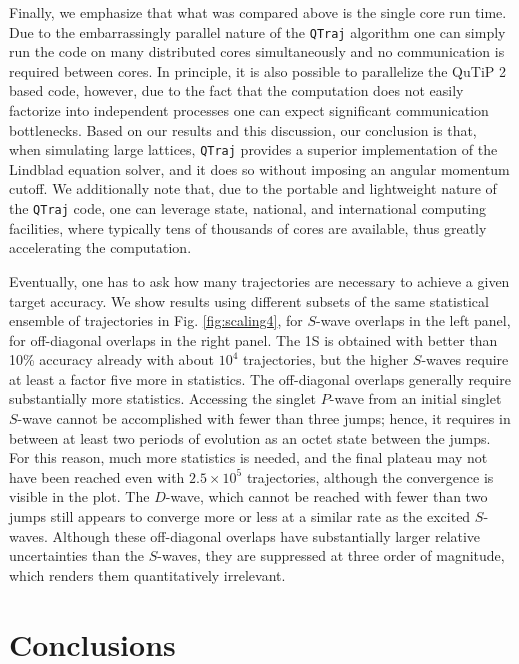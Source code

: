 \documentclass[times,sort&compress,final]{elsarticle}
\def\qtraj{{\tt QTraj} }
\begin{document}
Finally, we emphasize that what was compared above is the single core run time.  Due to the embarrassingly parallel nature of the \qtraj algorithm one can simply run the code on many distributed cores simultaneously and no communication is required between cores.  In principle, it is also possible to parallelize the QuTiP 2 based code, however, due to the fact that the computation does not easily factorize into independent processes one can expect significant communication bottlenecks. Based on our results and this discussion, our conclusion is that, when simulating large lattices, \qtraj provides a superior implementation of the Lindblad equation solver, and it does so without imposing an angular momentum cutoff.  We additionally note that, due to the portable and lightweight nature of the \qtraj code, one can leverage state, national, and international computing facilities, where typically tens of thousands of cores are available, thus greatly accelerating the computation.

Eventually, one has to ask how many trajectories are necessary to achieve a given target accuracy. 
We show results using different subsets of the same statistical ensemble of trajectories in Fig. \ref{fig:scaling4}, 
for $S$-wave overlaps in the left panel, for off-diagonal overlaps in the right panel.
The 1S is obtained with better than 10\% accuracy already with about $10^4$ trajectories, but the higher $S$-waves 
require at least a factor five more in statistics. 
The off-diagonal overlaps generally require substantially more statistics. 
Accessing the singlet $P$-wave from an initial singlet $S$-wave cannot be accomplished with fewer than three 
jumps; hence, it requires in between at least two periods of evolution as an octet state between the jumps.
For this reason, much more statistics is needed, and the final plateau may not have been reached even with 
$2.5\times 10^5$ trajectories, although the convergence is visible in the plot. 
The $D$-wave, which cannot be reached with fewer than two jumps still appears to converge more or less at a similar 
rate as the excited $S$-waves. 
Although these off-diagonal overlaps have substantially larger relative uncertainties than the $S$-waves, they are 
suppressed at three order of magnitude, which renders them quantitatively irrelevant. 


\section{Conclusions}
\label{sec:conclusions}
\end{document}
